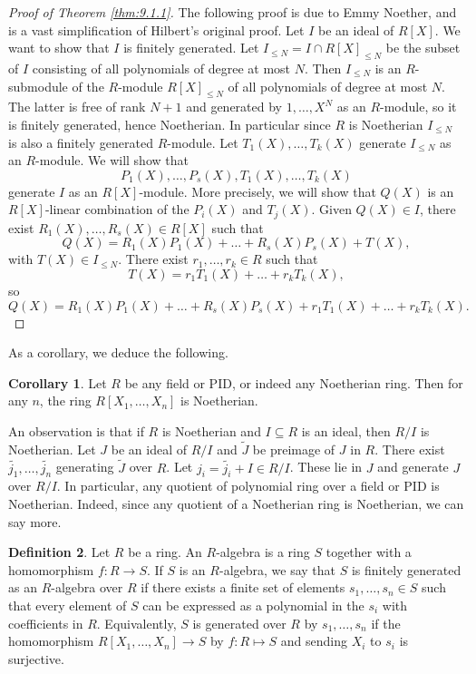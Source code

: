\documentclass{article}
\newcommand{\rb}[1]{\left( #1 \right)}
\renewcommand{\sb}[1]{\left[ #1 \right]}
\theoremstyle{definition}\newtheorem{definition}{Definition}[subsection]
\theoremstyle{definition}\newtheorem{remark}[definition]{Remark}
\theoremstyle{definition}\newtheorem*{example}{Example}
\theoremstyle{definition}\newtheorem*{note}{Note}
\newtheorem{corollary}[definition]{Corollary}
\begin{document}
\begin{proof}[Proof of Theorem \ref{thm:9.1.1}]
The following proof is due to Emmy Noether, and is a vast simplification of Hilbert's original proof. Let $ I $ be an ideal of $ R\sb{X} $. We want to show that $ I $ is finitely generated. Let $ I_{\le N} = I \cap R\sb{X}_{\le N} $ be the subset of $ I $ consisting of all polynomials of degree at most $ N $. Then $ I_{\le N} $ is an $ R $-submodule of the $ R $-module $ R\sb{X}_{\le N} $ of all polynomials of degree at most $ N $. The latter is free of rank $ N + 1 $ and generated by $ 1, \dots, X^N $ as an $ R $-module, so it is finitely generated, hence Noetherian. In particular since $ R $ is Noetherian $ I_{\le N} $ is also a finitely generated $ R $-module. Let $ T_1\rb{X}, \dots, T_k\rb{X} $ generate $ I_{\le N} $ as an $ R $-module. We will show that
$$ P_1\rb{X}, \dots, P_s\rb{X}, T_1\rb{X}, \dots, T_k\rb{X} $$
generate $ I $ as an $ R\sb{X} $-module. More precisely, we will show that $ Q\rb{X} $ is an $ R\sb{X} $-linear combination of the $ P_i\rb{X} $ and $ T_j\rb{X} $. Given $ Q\rb{X} \in I $, there exist $ R_1\rb{X}, \dots, R_s\rb{X} \in R\sb{X} $ such that
$$ Q\rb{X} = R_1\rb{X}P_1\rb{X} + \dots + R_s\rb{X}P_s\rb{X} + T\rb{X}, $$
with $ T\rb{X} \in I_{\le N} $. There exist $ r_1, \dots, r_k \in R $ such that
$$ T\rb{X} = r_1T_1\rb{X} + \dots + r_kT_k\rb{X}, $$
so
$$ Q\rb{X} = R_1\rb{X}P_1\rb{X} + \dots + R_s\rb{X}P_s\rb{X} + r_1T_1\rb{X} + \dots + r_kT_k\rb{X}. $$
\end{proof}

As a corollary, we deduce the following.

\begin{corollary}
Let $ R $ be any field or PID, or indeed any Noetherian ring. Then for any $ n $, the ring $ R\sb{X_1, \dots, X_n} $ is Noetherian.
\end{corollary}

An observation is that if $ R $ is Noetherian and $ I \subseteq R $ is an ideal, then $ R / I $ is Noetherian. Let $ J $ be an ideal of $ R / I $ and $ \widetilde{J} $ be preimage of $ J $ in $ R $. There exist $ \widetilde{j_1}, \dots, \widetilde{j_n} $ generating $ \widetilde{J} $ over $ R $. Let $ j_i = \widetilde{j_i} + I \in R / I $. These lie in $ J $ and generate $ J $ over $ R / I $. In particular, any quotient of polynomial ring over a field or PID is Noetherian. Indeed, since any quotient of a Noetherian ring is Noetherian, we can say more.

\begin{definition}
Let $ R $ be a ring. An $ R $-algebra is a ring $ S $ together with a homomorphism $ f : R \to S $. If $ S $ is an $ R $-algebra, we say that $ S $ is finitely generated as an $ R $-algebra over $ R $ if there exists a finite set of elements $ s_1, \dots, s_n \in S $ such that every element of $ S $ can be expressed as a polynomial in the $ s_i $ with coefficients in $ R $. Equivalently, $ S $ is generated over $ R $ by $ s_1, \dots, s_n $ if the homomorphism $ R\sb{X_1, \dots, X_n} \to S $ by $ f : R \mapsto S $ and sending $ X_i $ to $ s_i $ is surjective.
\end{definition}
\end{document}
